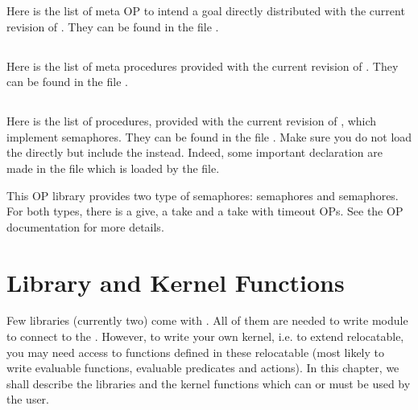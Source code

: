 Here is the list of meta OP to intend a goal directly distributed with the
current revision of \COPRSDE{}. They can be found in the file
.



\section{\protect{}}

Here is the list of meta procedures provided with the current revision
of \COPRSDE{}. They can be found in the file .




\section{\protect{}}

Here is the list of procedures, provided with the current revision of
\COPRSDE{}, which implement semaphores. They can be found in the file
. Make sure you do not load the  directly but
include the  instead. Indeed, some important declaration
are made in the   file which is loaded by the
 file.

This OP library provides two type of semaphores:  semaphores and
 semaphores. For both types, there is a give, a take and a take
with timeout OPs. See the OP documentation for more details.



\chapter{Library and Kernel Functions}

Few libraries (currently two) come with \COPRSDE{}. All of them are needed to
write module to connect to the \MP{}. However, to write your own kernel, i.e.
to extend relocatable, you may need access to functions defined in these
relocatable (most likely to write evaluable functions, evaluable predicates and
actions). In this chapter, we shall describe the libraries and the kernel
functions which can or must be used by the user.



